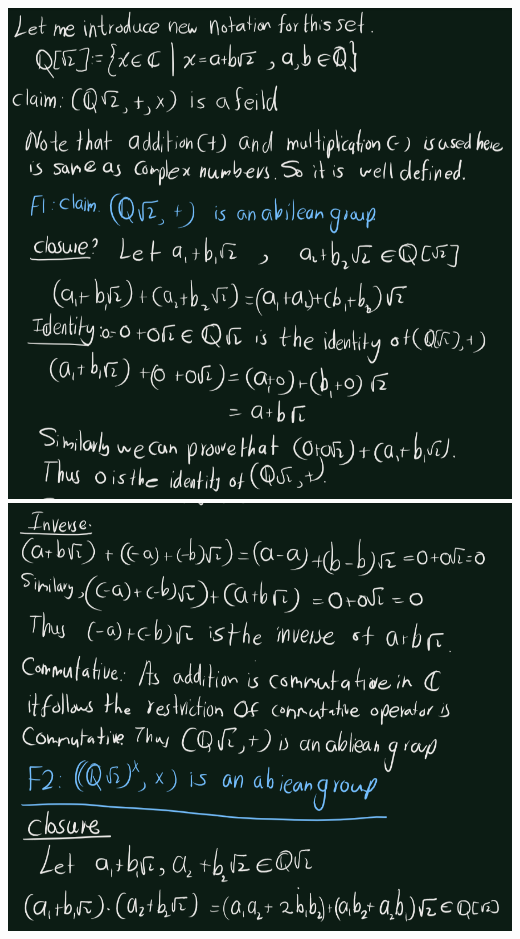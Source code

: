 \documentclass[
]{book}
\theoremstyle{definition}
\theoremstyle{definition}
\theoremstyle{definition}
\theoremstyle{definition}
\theoremstyle{remark}
\begin{document}
\includegraphics{figures/ch_3/ex-1.1-1.png}
\includegraphics{figures/ch_3/ex-1.1-2.png}
\end{document}
